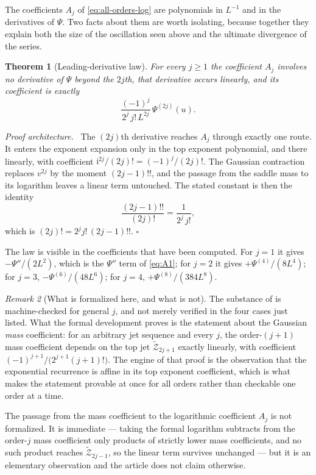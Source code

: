 \documentclass[11pt,oneside]{article}
\newtheorem{theorem}{Theorem}[section]
\theoremstyle{definition}
\theoremstyle{remark}
\newtheorem{remark}[theorem]{Remark}
\newcommand{\ii}{\mathrm i}
\newenvironment{proofidea}{\par\smallskip\noindent\textit{Proof architecture.}\ }{\hfill$\square$\par\smallskip}
\begin{document}
The coefficients $A_j$ of \eqref{eq:all-orders-log} are polynomials in $L^{-1}$ and in the
derivatives of $\Psi$.  Two facts about them are worth isolating, because together they
explain both the size of the oscillation seen above and the ultimate divergence of the
series.

\begin{theorem}[Leading-derivative law]
\label{thm:as-leading-derivative}
For every $j\ge1$ the coefficient $A_j$ involves no derivative of $\Psi$ beyond the
$2j$th, that derivative occurs linearly, and its coefficient is exactly
\begin{equation}
 \frac{(-1)^{j}}{2^{j}\,j!\,L^{2j}}\,\Psi^{(2j)}(u).       \label{eq:as-leading-derivative}
\end{equation}
\end{theorem}

\begin{proofidea}
The $(2j)$th derivative reaches $A_j$ through exactly one route.  It enters the exponent
expansion only in the top exponent polynomial, and there linearly, with coefficient
$\ii^{2j}/(2j)!=(-1)^{j}/(2j)!$.  The Gaussian contraction replaces $v^{2j}$ by the moment
$(2j-1)!!$, and the passage from the saddle mass to its logarithm leaves a linear term
untouched.  The stated constant is then the identity
\begin{equation*}
 \frac{(2j-1)!!}{(2j)!}=\frac1{2^{j}\,j!},
\end{equation*}
which is $(2j)!=2^{j}j!\,(2j-1)!!$.
\end{proofidea}

The law is visible in the coefficients that have been computed.  For $j=1$ it gives
$-\Psi''/(2L^{2})$, which is the $\Psi''$ term of \eqref{eq:A1}; for $j=2$ it gives
$+\Psi^{(4)}/(8L^{4})$; for $j=3$, $-\Psi^{(6)}/(48L^{6})$; for $j=4$,
$+\Psi^{(8)}/(384L^{8})$.

\begin{remark}[What is formalized here, and what is not]
\label{rem:as-leading-derivative-status}
The substance of  is machine-checked for general $j$, and
not merely verified in the four cases just listed.  What the formal development proves is
the statement about the Gaussian \emph{mass} coefficient: for an arbitrary jet sequence and
every $j$, the order-$(j+1)$ mass coefficient depends on the top jet
$\widetilde{\mathcal Z}_{2j+1}$ exactly linearly, with coefficient
$(-1)^{j+1}/\bigl(2^{j+1}(j+1)!\bigr)$.  The engine of that proof is the observation that the
exponential recurrence is affine in its top exponent coefficient, which is what makes the
statement provable at once for all orders rather than checkable one order at a time.

The passage from the mass coefficient to the logarithmic coefficient $A_j$ is not
formalized.  It is immediate --- taking the formal logarithm subtracts from the order-$j$
mass coefficient only products of strictly lower mass coefficients, and no such product
reaches $\widetilde{\mathcal Z}_{2j-1}$, so the linear term survives unchanged --- but it is
an elementary observation and the article does not claim otherwise.
\end{remark}
\end{document}
